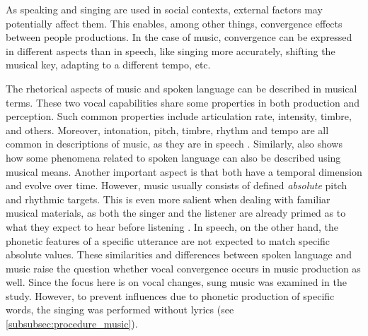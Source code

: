 


As speaking and singing are used in social contexts, external factors may potentially affect them.
This enables, among other things, convergence effects between people productions.
In the case of music, convergence can be expressed in different aspects than in speech, like singing more accurately, shifting the musical key, adapting to a different tempo, etc.

The rhetorical aspects of music and spoken language can be described in musical terms.
These two vocal capabilities share some properties in both production and perception.
Such common properties include articulation rate, intensity, timbre, and others.
Moreover, intonation, pitch, timbre, rhythm and tempo are all common in descriptions of music, as they are in speech \citep{Molino2000toward, Jackendoff2009parallels}.
Similarly, \citet{Day2013speech} also shows how some phenomena related to spoken language can also be described using musical means.
Another important aspect is that both have a temporal dimension and evolve over time.
However, music usually consists of defined \emph{absolute} pitch and rhythmic targets.
This is even more salient when dealing with familiar musical materials, as both the singer and the listener are already primed as to what they expect to hear before listening \citep{Meyer2008emotion}.
In speech, on the other hand, the phonetic features of a specific utterance are not expected to match specific absolute values.
These similarities and differences between spoken language and music raise the question whether vocal convergence occurs in music production as well.
Since the focus here is on vocal changes, sung music was examined in the study.
However, to prevent influences due to phonetic production of specific words, the singing was performed without lyrics (see \cref{subsubsec:procedure_music}).

